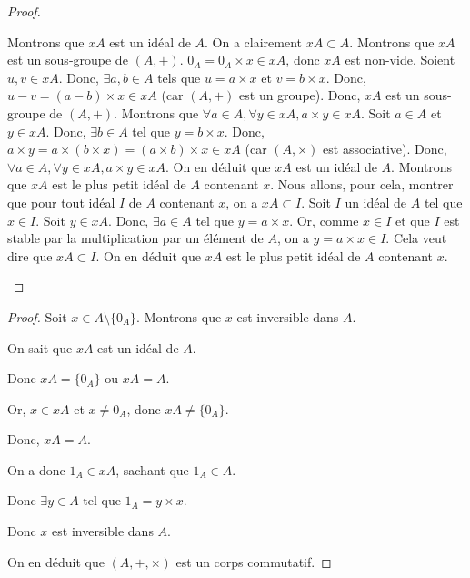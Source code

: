 \documentclass[12pt,a4paper]{report}
\begin{document}
\begin{proof}
    \begin{outline}
        \1 Montrons que $xA$ est un idéal de $A$.
            \2 On a clairement $xA \subset A$.
            \2 Montrons que $xA$ est un sous-groupe de $(A,+)$.
                \3 $0_A = 0_A \times x \in xA$, donc $xA$ est non-vide.
                \3 Soient $u,v \in xA$. Donc, $\exists a,b \in A$ tels que $u = a \times x$ et $v = b \times x$.
                \3 Donc, $u - v = (a - b) \times x \in xA$ (car $(A,+)$ est un groupe).
            \2 Donc, $xA$ est un sous-groupe de $(A,+)$.
            \2 Montrons que $\forall a \in A, \forall y \in xA, a \times y \in xA$.
                \3 Soit $a \in A$ et $y \in xA$. Donc, $\exists b \in A$ tel que $y = b \times x$.
                \3 Donc, $a \times y = a \times (b \times x) = (a \times b) \times x \in xA$ (car $(A,\times)$ est associative).
            \2 Donc, $\forall a \in A, \forall y \in xA, a \times y \in xA$.
        \1 On en déduit que $xA$ est un idéal de $A$.
        \1 Montrons que $xA$ est le plus petit idéal de $A$ contenant $x$. Nous allons, pour cela, montrer que pour tout idéal $I$ de $A$ contenant $x$, on a $xA \subset I$.
            \2 Soit $I$ un idéal de $A$ tel que $x \in I$.
            \2 Soit $y \in xA$. Donc, $\exists a \in A$ tel que $y = a \times x$.
            \2 Or, comme $x \in I$ et que $I$ est stable par la multiplication par un élément de $A$, on a $y = a \times x \in I$. Cela veut dire que $xA \subset I$.
        \1 On en déduit que $xA$ est le plus petit idéal de $A$ contenant $x$.
    \end{outline}
\end{proof}

\begin{proof}
    Soit $x \in A\setminus\{0_A\}$. Montrons que $x$ est inversible dans $A$.

    On sait que $xA$ est un idéal de $A$.

    Donc $xA = \{0_A\}$ ou $xA = A$.

    Or, $x \in xA$ et $x \ne 0_A$, donc $xA \ne \{0_A\}$.

    Donc, $xA = A$.

    On a donc $1_A \in xA$, sachant que $1_A\in A$.

    Donc $\exists y \in A$ tel que $1_A = y \times x$.

    Donc $x$ est inversible dans $A$.

    On en déduit que $(A,+,\times)$ est un corps commutatif.
\end{proof}
\end{document}
